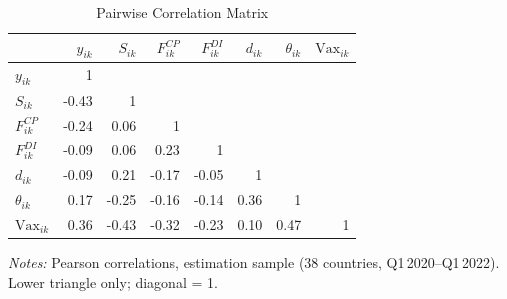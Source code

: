 \begin{table}[H]
\centering
\caption{Pairwise Correlation Matrix}
\label{tab:corr_matrix}
\small
\begin{tabular}{@{} lrrrrrrr @{}}
\toprule
 & $y_{ik}$ & $S_{ik}$ & $F^{CP}_{ik}$ & $F^{DI}_{ik}$ & $d_{ik}$ & $\theta_{ik}$ & $\text{Vax}_{ik}$ \\
\midrule
$y_{ik}$ & 1 &  &  &  &  &  &  \\
$S_{ik}$ & -0.43 & 1 &  &  &  &  &  \\
$F^{CP}_{ik}$ & -0.24 & 0.06 & 1 &  &  &  &  \\
$F^{DI}_{ik}$ & -0.09 & 0.06 & 0.23 & 1 &  &  &  \\
$d_{ik}$ & -0.09 & 0.21 & -0.17 & -0.05 & 1 &  &  \\
$\theta_{ik}$ & 0.17 & -0.25 & -0.16 & -0.14 & 0.36 & 1 &  \\
$\text{Vax}_{ik}$ & 0.36 & -0.43 & -0.32 & -0.23 & 0.10 & 0.47 & 1 \\
\bottomrule
\end{tabular}
\vspace{4pt}

\parbox{\textwidth}{\footnotesize\textit{Notes:} Pearson correlations, estimation sample (38 countries, Q1\,2020--Q1\,2022). Lower triangle only; diagonal = 1.}
\end{table}

